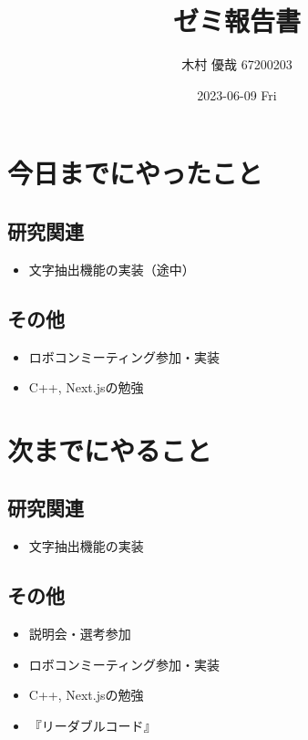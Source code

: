 \documentclass[uplatex, onecolumn, 10pt]{jsarticle}
\begin{document}
\title{\vspace{-40mm}\bf{\LARGE{ゼミ報告書}}}
\author{\vspace{-40mm}木村 優哉 67200203}
\date{2023-06-09 Fri}
\maketitle


\section{今日までにやったこと}

\subsection*{研究関連}
\begin{itemize}
	\item 文字抽出機能の実装（途中）
\end{itemize}

\subsection*{その他}
\begin{itemize}
	\item ロボコンミーティング参加・実装
	\item C++, Next.jsの勉強
\end{itemize}


\section{次までにやること}

\subsection*{研究関連}
\begin{itemize}
	\item 文字抽出機能の実装
\end{itemize}

\subsection*{その他}
\begin{itemize}
	\item 説明会・選考参加
	\item ロボコンミーティング参加・実装
	\item C++, Next.jsの勉強
	\item 『リーダブルコード』
\end{itemize}
\end{document}
